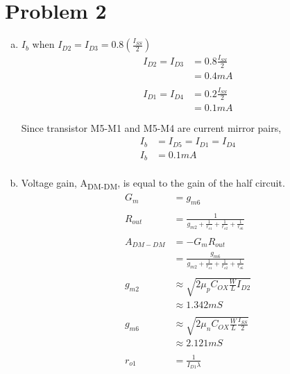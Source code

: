 \documentclass{article}
\begin{document}
\section{Problem 2}
\label{sec:org574b9e5}
\begin{enumerate}[(a)]
\item \(I_{b}\) when \(I_{D2} = I_{D3} = 0.8(\frac{I_{SS}}{2})\)
\begin{equation*}
\begin{aligned}
I_{D2} = I_{D3} &= 0.8 \frac{I_{SS}}{2} \\
&= 0.4 mA \\
\\
I_{D1} = I_{D4} &= 0.2 \frac{I_{SS}}{2} \\
&= 0.1 mA \\
\\
\end{aligned}
\end{equation*}
Since transistor M5-M1 and M5-M4 are current mirror pairs,
\begin{equation*}
\begin{aligned}
I_{b} &= I_{D5} = I_{D1} = I_{D4} \\
I_{b} &= 0.1 mA \\
\end{aligned}
\end{equation*}
\item Voltage gain, A\textsubscript{DM-DM}, is equal to the gain of the half circuit.
\begin{equation*}
\begin{aligned}
G_{m} &= g_{m6} \\
\\
R_{out} &= \frac{1}{g_{m2} + \frac{1}{r_{o1}} + \frac{1}{r_{o2}} + \frac{1}{r_{o6}}} \\
\\
A_{DM-DM} &= -G_{m}R_{out} \\
&= \frac{g_{m6}}{g_{m2} + \frac{1}{r_{o1}} + \frac{1}{r_{o2}} + \frac{1}{r_{o6}}} \\
\\
g_{m2} &\approx \sqrt{2\mu_{p}C_{OX}\frac{W}{L}I_{D2}} \\
&\approx 1.342 mS \\
\\
g_{m6} &\approx \sqrt{2\mu_{n}C_{OX}\frac{W}{L}\frac{I_{SS}}{2}} \\
&\approx 2.121 mS \\
\\
r_{o1} &= \frac{1}{I_{D1}\lambda} \\

\end{aligned}
\end{equation*}
\end{enumerate}
\end{document}
